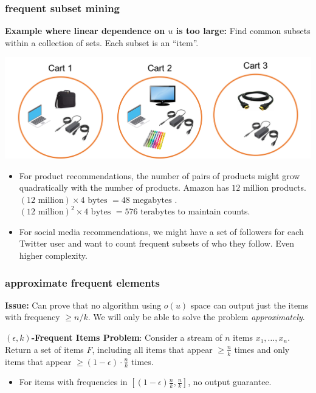\documentclass[]{beamer}
\begin{document}
	
	\begin{frame}
		\frametitle{frequent subset mining}
		\small
		\textbf{Example where linear dependence on $u$ is too large:} Find common subsets within a collection of sets. Each subset is an ``item''.
		\begin{center}
			\includegraphics[width=.75\textwidth]{itemset1.png}
		\end{center}
		\begin{itemize}
			\item For product recommendations, the number of pairs of products might grow quadratically with the number of products. Amazon has $12$ million products. $(12 \text{ million})\times 4 \text{ bytes }= 48 \text{ megabytes }$.  $(12 \text{ million})^2\times 4 \text{ bytes }= 576 \text{ terabytes}$ to maintain counts.
			\item For social media recommendations, we might have a set of followers for each Twitter user and want to count frequent subsets of who they follow. Even higher complexity. 
		\end{itemize}
	\end{frame}
	
	\begin{frame}
		\frametitle{approximate frequent elements}
		\textbf{Issue:} Can prove that no algorithm using $o(u)$ space can output just the items with frequency $\ge n/k$. We will only be able to solve the problem \emph{approximately}.
		
		\vspace{1em}
		\textbf{$(\epsilon,k)$-Frequent Items Problem}: Consider a stream of $n$ items $x_1,\ldots, x_n$. Return a set  of items $F$, including \alert{all items that appear $ \geq \frac{n}{k}$ times} and \alert{only items that appear $\geq (1-\epsilon) \cdot \frac{n}{k}$ times}.
		\begin{itemize}
			\item For items with frequencies in $[(1-\epsilon) \frac{n}{k},\frac{n}{k}]$, no output guarantee.
		\end{itemize}
	
	\end{frame}
	
\end{document}

